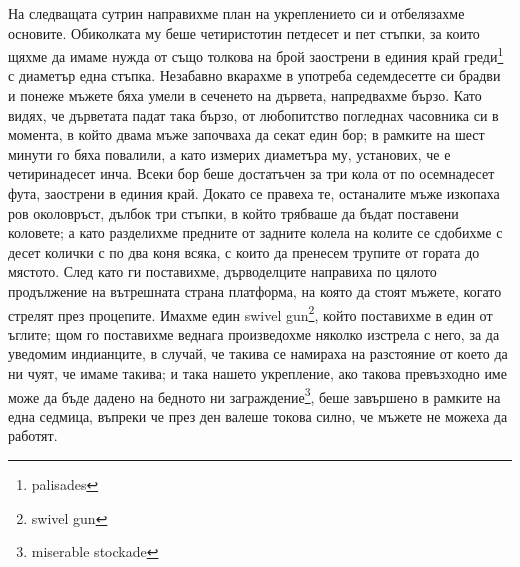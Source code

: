 \documentclass[12pt]{book}
\begin{document}
На следващата сутрин направихме план на укреплението си и отбелязахме основите. Обиколката му беше четиристотин петдесет и пет стъпки, за които щяхме да имаме нужда от също толкова на брой заострени в единия край греди\footnote{palisades} с диаметър една стъпка. Незабавно вкарахме в употреба седемдесетте си брадви и понеже мъжете бяха умели в сеченето на дървета, напредвахме бързо. Като видях, че дърветата падат така бързо, от любопитство погледнах часовника си в момента, в който двама мъже започваха да секат един бор; в рамките на шест минути го бяха повалили, а като измерих диаметъра му, установих, че е четиринадесет инча. Всеки бор беше достатъчен за три кола от по осемнадесет фута, заострени в единия край. Докато се правеха те, останалите мъже изкопаха ров околовръст, дълбок три стъпки, в който трябваше да бъдат поставени коловете; а като разделихме предните от задните колела на колите се сдобихме с десет колички с по два коня всяка, с които да пренесем трупите от гората до мястото. След като ги поставихме, дърводелците направиха по цялото продължение на вътрешната страна платформа, на която да стоят мъжете, когато стрелят през процепите. Имахме един swivel gun\footnote{swivel gun}, който поставихме в един от ъглите; щом го поставихме веднага произведохме няколко изстрела с него, за да уведомим индианците, в случай, че такива се намираха на разстояние от което да ни чуят,  че имаме такива; и така нашето укрепление, ако такова превъзходно име може да бъде дадено на бедното ни заграждение\footnote{miserable stockade}, беше завършено в рамките на една седмица, въпреки че през ден валеше токова силно, че мъжете не можеха да работят.
\end{document}
